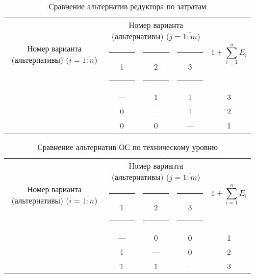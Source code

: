 \begin{table}[ht!]
    \centering
    \begin{tabular}{|c|c|c|c|c|}
        \hline
        \multirow{2}{2.4cm}[-0.5pc]{
            \centering
            Номер варианта (альтернативы) ($i = \overline{1:n}$)
        } &
        \multicolumn{3}{c|}{
            \parbox[t]{2.4cm}{
                \centering
                Номер варианта (альтернативы) ($j = \overline{1:m}$)
            }
        } &
        \multirow{2}{1.7cm}{
            \centering
            $$1 + \sum_{i=1}^n E_i$$
        } \\
        &
        \centering \rule{2pt}{0pt} 1 \rule{2pt}{0pt} &
        \centering \rule{2pt}{0pt} 2 \rule{2pt}{0pt} &
        \centering \rule{2pt}{0pt} 3 \rule{2pt}{0pt} & \\
        \hline \hline
        \centering{1} &---& 1 & 1 & 3 \\ \hline
        \centering{2} & 0 &---& 1 & 2 \\ \hline
        \centering{3} & 0 & 0 &---& 1 \\ \hline
    \end{tabular}
    \caption{Сравнение альтернатив редуктора по затратам}
    \label{tbl_red_cost_lvl_comparison}
\end{table}

\begin{table}[ht!]
    \centering
    \begin{tabular}{|c|c|c|c|c|}
        \hline
        \multirow{2}{2.4cm}[-0.5pc]{
            \centering
            Номер варианта (альтернативы) ($i = \overline{1:n}$)
        } &
        \multicolumn{3}{c|}{
            \parbox[t]{2.4cm}{
                \centering
                Номер варианта (альтернативы) ($j = \overline{1:m}$)
            }
        } &
        \multirow{2}{1.7cm}{
            \centering
            $$1 + \sum_{i=1}^n E_i$$
        } \\
        &
        \centering \rule{2pt}{0pt} 1 \rule{2pt}{0pt} &
        \centering \rule{2pt}{0pt} 2 \rule{2pt}{0pt} &
        \centering \rule{2pt}{0pt} 3 \rule{2pt}{0pt} & \\
        \hline \hline
        \centering{1} &---& 0 & 0 & 1 \\ \hline
        \centering{2} & 1 &---& 0 & 2 \\ \hline
        \centering{3} & 1 & 1 &---& 3 \\ \hline
    \end{tabular}
    \caption{Сравнение альтернатив ОС по техническому уровню}
    \label{tbl_os_tech_lvl_comparison}
\end{table}

